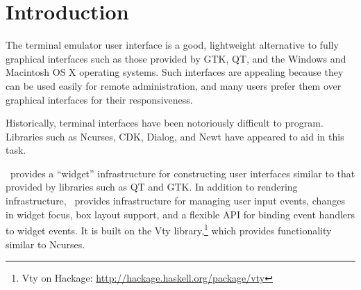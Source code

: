 \chapter{Introduction}

The terminal emulator user interface is a good, lightweight
alternative to fully graphical interfaces such as those provided by
GTK, QT, and the Windows and Macintosh OS X operating systems.  Such
interfaces are appealing because they can be used easily for remote
administration, and many users prefer them over graphical interfaces
for their responsiveness.

Historically, terminal interfaces have been notoriously difficult to
program.  Libraries such as Ncurses, CDK, Dialog, and Newt have
appeared to aid in this task.

\vtyui\ provides a “widget” infrastructure for constructing user
interfaces similar to that provided by libraries such as QT and GTK.
In addition to rendering infrastructure, \vtyui\ provides
infrastructure for managing user input events, changes in widget
focus, box layout support, and a flexible API for binding event
handlers to widget events.  It is built on the Vty
library,\footnote{Vty on Hackage:
  \href{http://hackage.haskell.org/package/vty}{http://hackage.haskell.org/package/vty}}
which provides functionality similar to Ncurses.



